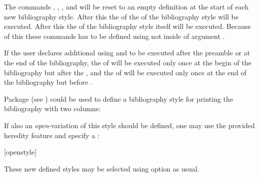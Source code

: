 The commands , , ,
and  will be reset to an empty definition at the start of
each new bibliography style. After this the  of the
 of the bibliography style will be executed. After this
the  of the bibliography style itself will be
executed. Because of this these commands has to be defined using
not  inside of argument .

If the user declares additional  using
 and
 to be
executed after the preamble or at the end of the bibliography, the
 of  will be executed
only once at the begin of the bibliography but after the 
, and the  of
 will be executed only once at the end of the
bibliography but before .

Package
 (see
\cite{package:multicol}) could be used to define a bibliography style for
printing the bibliography with two columns:
\begin{lstcode}[belowskip=\dp\strutbox plus 1ex]
\end{lstcode}
If also an \emph{open}-variation of this style should be defined, one may use
the provided heredity feature and specify a :
\begin{lstcode}[belowskip=\dp\strutbox plus 1ex]
  [openstyle]{%
    \renewcommand*{\bib@beginhook}{\begin{multicols}{2}}%
    \renewcommand*{\bib@endhook}{\end{multicols}}}%
\end{lstcode}
These new defined styles may be selected using option 
as usual.%
%
%
%
%
%
%



